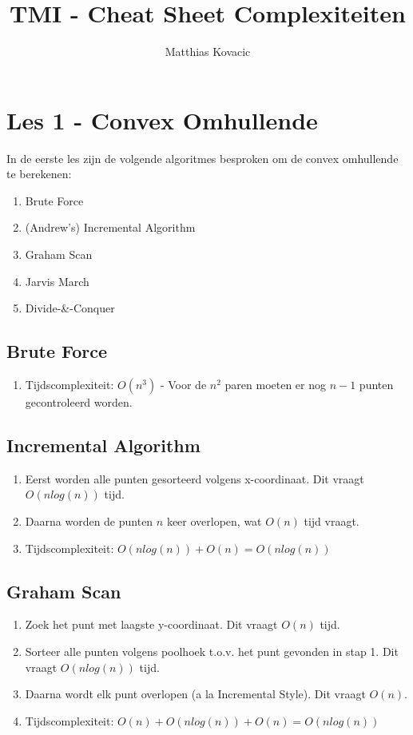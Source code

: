 \documentclass[12pt,a4paper]{article}
\author{Matthias Kovacic}
\title{TMI - Cheat Sheet Complexiteiten}
\begin{document}
	\maketitle
	\section{Les 1 - Convex Omhullende}
		In de eerste les zijn de volgende algoritmes besproken om de convex omhullende te berekenen:
		\begin{enumerate}
			\item Brute Force
			\item (Andrew's) Incremental Algorithm
			\item Graham Scan
			\item Jarvis March
			\item Divide-\&-Conquer
		\end{enumerate}
	
		\subsection{Brute Force}
			\begin{enumerate}
				\item Tijdscomplexiteit: $O(n^3)$ - Voor de $n^2$ paren moeten er nog $n - 1$ punten gecontroleerd worden.
			\end{enumerate}
		
		\subsection{Incremental Algorithm}
			\begin{enumerate}
				\item Eerst worden alle punten gesorteerd volgens x-coordinaat. Dit vraagt $O(n log (n))$ tijd.
				\item Daarna worden de punten $n$ keer overlopen, wat $O(n)$ tijd vraagt.
				\item Tijdscomplexiteit: $O(n log(n)) + O(n) = O(n log (n))$
			\end{enumerate}
		
		\subsection{Graham Scan}
			\begin{enumerate}
				\item Zoek het punt met laagste y-coordinaat. Dit vraagt $O(n)$ tijd.
				\item Sorteer alle punten volgens poolhoek t.o.v. het punt gevonden in stap 1. Dit vraagt $O(n log (n))$ tijd.
				\item Daarna wordt elk punt overlopen (a la Incremental Style). Dit vraagt $O(n)$.
				\item Tijdscomplexiteit: $O(n) + O(n log(n)) + O(n) = O(n log (n))$
			\end{enumerate}
		
\end{document}
